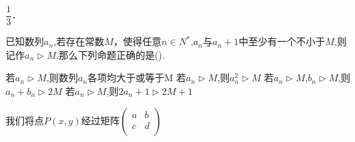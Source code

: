 \documentclass[a4paper,marginl,answers]{BHCexam}
\begin{document}
\begin{questions}
\begin{solution}
        $\dfrac{1}{3}$．
\end{solution}

\question
  已知数列${a_n}$,若存在常数$M$，使得任意$n\in N^*$,$a_n$与$a_n+1$中至少有一个不小于$M$,则记作${a_n}\rhd M$,那么下列命题正确的是(\quad).

\begin{choices}
  \choice 若${a_n}\rhd M$,则数列${a_n}$各项均大于或等于M
  \choice 若${a_n}\rhd M$,则${a_n^2}\rhd M$
  \choice 若${a_n}\rhd M$,${b_n}\rhd M$,则${a_n+b_n}\rhd 2M$
  \choice 若${a_n}\rhd M$,则${2a_n+1}\rhd 2M+1$
\end{choices}

\jianda

\question[2]
我们将点$P(x,y)$经过矩阵$\left( \begin{array}{ccc} a& b\\ c& d\\ \end{array} \right)$

\end{questions}
\end{document}
